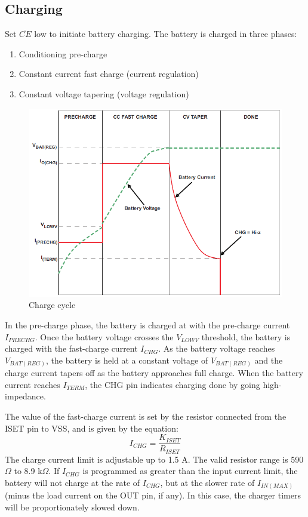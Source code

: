 \documentclass[11pt,a4paper]{article}
\begin{document}
\subsection{Charging}
Set $\overline{CE}$ low to initiate battery charging. The battery is charged in three phases: 
\begin{enumerate}
	\item Conditioning pre-charge
	\item Constant current fast charge (current regulation) 
	\item Constant voltage tapering (voltage regulation)
\end{enumerate}
\begin{figure}[H]
	\centering
	\includegraphics[width=1.0\linewidth]{Charge_cycle}
	\caption{Charge cycle}
	\label{fig:Charge _cycle}
\end{figure}
In the pre-charge phase, the battery is charged at with the pre-charge current $I_{PRECHG}$. Once the battery voltage crosses the $V_{LOWV}$ threshold, the battery is charged with the fast-charge current $I_{CHG}$. As the battery voltage reaches $V_{BAT(REG)}$, the battery is held at a constant voltage of $V_{BAT(REG)}$ and the charge current tapers off as the battery approaches full charge. When the battery current reaches $I_{TERM}$, the CHG pin indicates charging done by going high-impedance.

The value of the fast-charge current is set by the resistor connected from the ISET pin to VSS, and is given by the equation:
\[ I_{CHG} = \frac{K_{ISET}}{R_{ISET}} \]
The charge current limit is adjustable up to 1.5 A. The valid resistor range is 590 $\Omega$ to 8.9 k$\Omega$. If $I_{CHG}$ is programmed as greater than the input current limit, the battery will not charge at the rate of $I_{CHG}$, but at the slower rate of $I_{IN(MAX)}$ (minus the load current on the OUT pin, if any). In this case, the charger timers will be proportionately slowed down.
\end{document}
